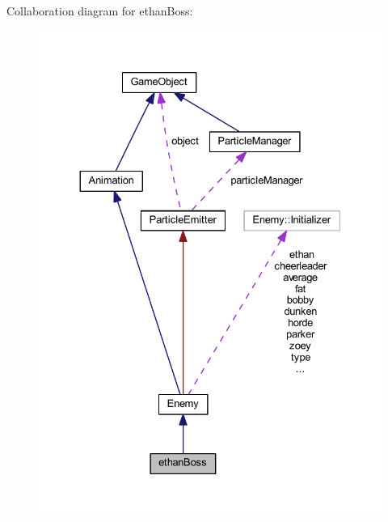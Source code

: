 Collaboration diagram for ethan\+Boss\+:\nopagebreak
\begin{figure}[H]
\begin{center}
\leavevmode
\includegraphics[width=330pt]{classethan_boss__coll__graph}
\end{center}
\end{figure}
